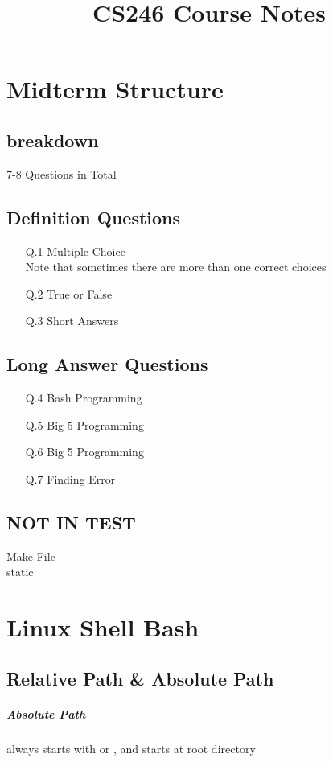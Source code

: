\documentclass{report}
\title{CS246 Course Notes}
\begin{document}
\maketitle
\chapter{Midterm Structure}
\section{breakdown}
7-8 Questions in Total\\
\section{Definition Questions}
\begin{itemize}
\item[Q.1] Multiple Choice \\
Note that sometimes there are more than one correct choices
\item[Q.2] True or False
\item[Q.3] Short Answers
\end{itemize}
\section{Long Answer Questions}
\begin{itemize}
\item[Q.4] Bash Programming
\item[Q.5] Big 5 Programming
\item[Q.6] Big 5 Programming
\item[Q.7] Finding Error 
\end{itemize}
\section{NOT IN TEST}
Make File\\static
\chapter{Linux Shell Bash}
\section{Relative Path \& Absolute Path}
\paragraph{Absolute Path}
always starts with \ibx{/} or \ibx{$\sim$/}, and starts at root directory
\end{document}
